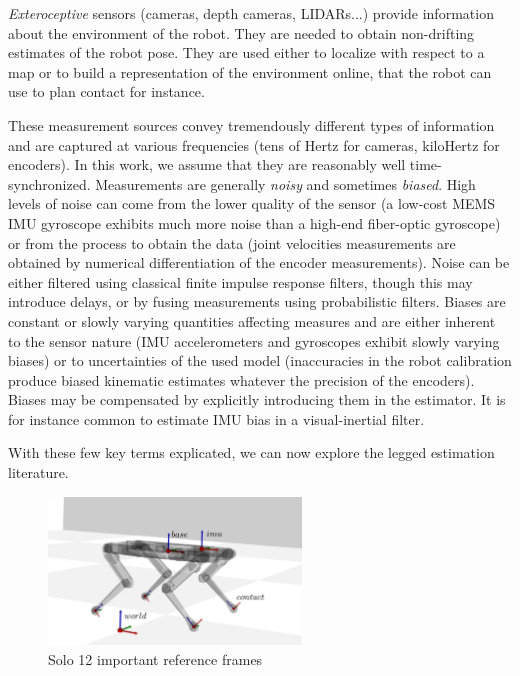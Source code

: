 \textit{Exteroceptive} sensors (cameras, depth cameras, LIDARs...) provide information about the environment of the robot.  
They are needed to obtain non-drifting estimates of the robot pose. 
They are used either to localize with respect to a map or to build a representation of the environment online, that the robot can use to plan contact for instance. 

These measurement sources convey tremendously different types of information and are captured at various frequencies (\eg tens of Hertz for cameras, kiloHertz for encoders). 
In this work, we assume that they are reasonably well time-synchronized. Measurements are generally \textit{noisy} and sometimes \textit{biased}. High levels of noise can 
come from the lower quality of the sensor (a low-cost MEMS IMU gyroscope exhibits much more noise than a high-end fiber-optic gyroscope) or from the process to obtain the
data (joint velocities measurements are obtained by numerical differentiation of the encoder measurements). Noise can be either filtered using classical finite impulse 
response filters, though this may introduce delays, or by fusing measurements using probabilistic filters. Biases are constant or slowly varying quantities affecting measures 
and are either inherent to the sensor nature (IMU accelerometers and gyroscopes exhibit slowly varying biases) or to uncertainties of the used model (inaccuracies
in the robot calibration produce biased kinematic estimates whatever the precision of the encoders). Biases may be compensated by explicitly introducing them in 
the estimator. It is for instance common to estimate IMU bias in a visual-inertial filter. 

With these few key terms explicated, we can now explore the legged estimation literature.


\begin{figure}
    \centering
    \centering
    \includegraphics[width=0.6\textwidth]{figures/solo_frames.pdf}
    \caption{Solo 12 \cite{grimminger2020open} important reference frames}
    \label{fig:solo_frames}
\end{figure}
    

